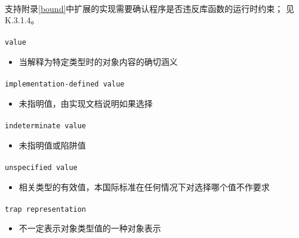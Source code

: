 \paragraph{}
\notes 支持附录\ref{bound}中扩展的实现需要确认程序是否违反库函数的运行时约束；
见K.3.1.4。

\paragraph{}
\texttt{value}
\begin{itemize}
  \item[]{当解释为特定类型时的对象内容的确切涵义}
\end{itemize}

\paragraph{}
\texttt{implementation-defined value}
\begin{itemize}
  \item[]{未指明值，由实现文档说明如果选择}
\end{itemize}

\paragraph{}
\texttt{indeterminate value}
\begin{itemize}
  \item[]{未指明值或陷阱值}
\end{itemize}

\paragraph{}
\texttt{unspecified value}
\begin{itemize}
  \item[]{相关类型的有效值，本国际标准在任何情况下对选择哪个值不作要求}
\end{itemize}

\paragraph{}
\texttt{trap representation}
\begin{itemize}
  \item[]{不一定表示对象类型值的一种对象表示}
\end{itemize}

